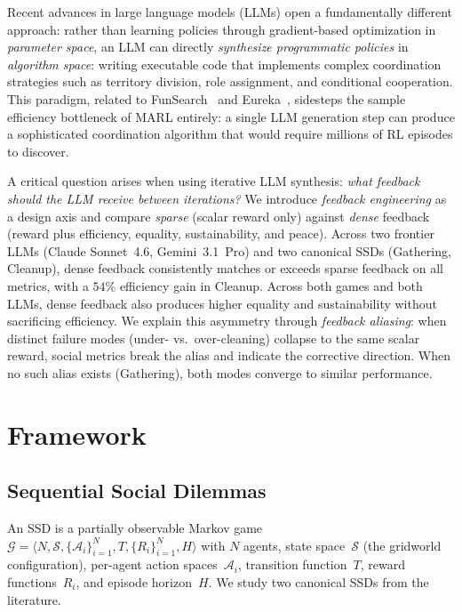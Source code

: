 \documentclass{nextgame2026} %
\begin{document}
Recent advances in large language models (LLMs) open a fundamentally
different approach: rather than learning policies through gradient-based
optimization in \emph{parameter space}, an LLM can directly \emph{synthesize
programmatic policies} in \emph{algorithm space}: writing executable code
that implements complex coordination strategies such as territory division,
role assignment, and conditional cooperation.  This paradigm, related to
FunSearch~\citep{romera2024mathematical} and
Eureka~\citep{ma2024eureka}, sidesteps the sample efficiency bottleneck of
MARL entirely: a single LLM generation step can produce a sophisticated
coordination algorithm that would require millions of RL episodes to
discover.

A critical question arises when using iterative LLM synthesis: \emph{what
feedback should the LLM receive between iterations?}  We introduce
\emph{feedback engineering} as a design axis and compare \emph{sparse}
(scalar reward only) against \emph{dense} feedback (reward plus
efficiency, equality, sustainability, and peace).  Across two frontier LLMs
(Claude Sonnet~4.6, Gemini~3.1~Pro) and two canonical SSDs (Gathering,
Cleanup), dense feedback consistently matches or exceeds sparse feedback on
all metrics, with a $54\%$ efficiency gain in Cleanup. Across both games and both LLMs, dense feedback also produces higher equality and sustainability without sacrificing efficiency.
We explain this asymmetry through \emph{feedback aliasing}: when distinct
failure modes (under- vs.\ over-cleaning) collapse to the same scalar
reward, social metrics break the alias and indicate the corrective
direction. When no such alias exists (Gathering), both modes converge to
similar performance.


\section{Framework}
\label{sec:framework}

\subsection{Sequential Social Dilemmas}
\label{sec:ssds}

An SSD is a partially observable Markov game
$\mathcal{G} = \langle N, \mathcal{S}, \{\mathcal{A}_i\}_{i=1}^N, T, \{R_i\}_{i=1}^N, H \rangle$
with $N$ agents, state space~$\mathcal{S}$ (the gridworld configuration),
per-agent action spaces~$\mathcal{A}_i$, transition
function~$T$, reward functions~$R_i$, and episode horizon~$H$.  We study two canonical SSDs from the literature. 
\end{document}
